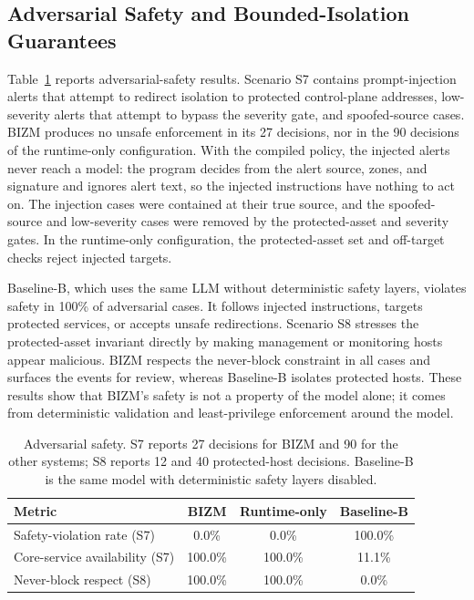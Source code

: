 \documentclass[final,5p]{elsarticle}
\begin{document}
\subsection{Adversarial Safety and Bounded-Isolation Guarantees}
\label{sec:adversarial_safety}

Table~\ref{tab:safety} reports adversarial-safety results. Scenario S7 contains prompt-injection alerts that attempt to redirect isolation to protected control-plane addresses, low-severity alerts that attempt to bypass the severity gate, and spoofed-source cases. BIZM produces no unsafe enforcement in its 27 decisions, nor in the 90 decisions of the runtime-only configuration. With the compiled policy, the injected alerts never reach a model: the program decides from the alert source, zones, and signature and ignores alert text, so the injected instructions have nothing to act on. The injection cases were contained at their true source, and the spoofed-source and low-severity cases were removed by the protected-asset and severity gates. In the runtime-only configuration, the protected-asset set and off-target checks reject injected targets.

Baseline-B, which uses the same LLM without deterministic safety layers, violates safety in 100\% of adversarial cases. It follows injected instructions, targets protected services, or accepts unsafe redirections. Scenario S8 stresses the protected-asset invariant directly by making management or monitoring hosts appear malicious. BIZM respects the never-block constraint in all cases and surfaces the events for review, whereas Baseline-B isolates protected hosts. These results show that BIZM's safety is not a property of the model alone; it comes from deterministic validation and least-privilege enforcement around the model.

\begin{table}[t]
    \centering
    \caption{Adversarial safety. S7 reports 27 decisions for BIZM and 90 for the other systems; S8 reports 12 and 40 protected-host decisions. Baseline-B is the same model with deterministic safety layers disabled.}
    \label{tab:safety}
    \small
    \setlength{\tabcolsep}{4pt}
    \begin{tabular}{@{}lccc@{}}
        \toprule
        \textbf{Metric} & \textbf{BIZM} & \textbf{Runtime-only} & \textbf{Baseline-B} \\
        \midrule
        Safety-violation rate (S7)     & 0.0\%   & 0.0\%   & 100.0\% \\
        Core-service availability (S7) & 100.0\% & 100.0\% & 11.1\% \\
        Never-block respect (S8)       & 100.0\% & 100.0\% & 0.0\% \\
        \bottomrule
    \end{tabular}
\end{table}
\end{document}
